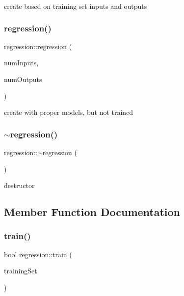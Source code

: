 create based on training set inputs and outputs \mbox{\label{classregression_ae3474e3fbc7c31a80ad862dd18f7489d}} 
\subsubsection{\texorpdfstring{regression()}{regression()}\hspace{0.1cm}{\footnotesize\ttfamily [3/3]}}
{\footnotesize\ttfamily regression\+::regression (\begin{DoxyParamCaption}\item[{const int \&}]{num\+Inputs,  }\item[{const int \&}]{num\+Outputs }\end{DoxyParamCaption})}

create with proper models, but not trained \mbox{\label{classregression_abde9f6759b404a8fe6db7d2a96acda0c}} 
\subsubsection{\texorpdfstring{$\sim$regression()}{~regression()}}
{\footnotesize\ttfamily regression\+::$\sim$regression (\begin{DoxyParamCaption}{ }\end{DoxyParamCaption})\hspace{0.3cm}{\ttfamily [inline]}}

destructor 

\subsection{Member Function Documentation}
\mbox{\label{classregression_afb1956067fda0d20d2ed755086c9f592}} 
\subsubsection{\texorpdfstring{train()}{train()}}
{\footnotesize\ttfamily bool regression\+::train (\begin{DoxyParamCaption}\item[{const std\+::vector$<$ \hyperlink{structtraining_example}{training\+Example} $>$ \&}]{training\+Set }\end{DoxyParamCaption})\hspace{0.3cm}{\ttfamily [virtual]}}

